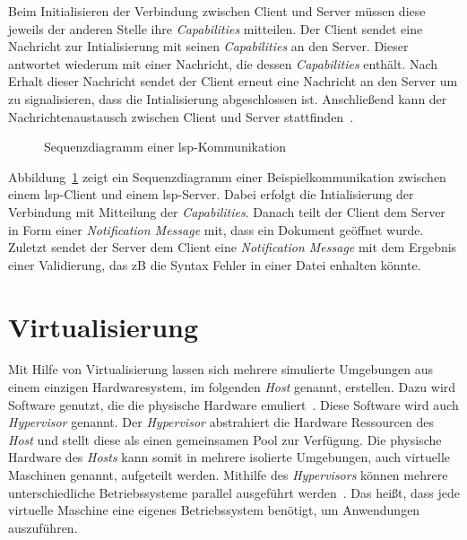 Beim Initialisieren der Verbindung zwischen Client und Server müssen diese jeweils der anderen Stelle ihre \textit{Capabilities} mitteilen.
Der Client sendet eine Nachricht zur Intialisierung mit seinen \textit{Capabilities} an den Server.
Dieser antwortet wiederum mit einer Nachricht, die dessen \textit{Capabilities} enthält.
Nach Erhalt dieser Nachricht sendet der Client erneut eine Nachricht an den Server um zu signalisieren, dass die Intialisierung abgeschlossen ist.
Anschließend kann der Nachrichtenaustausch zwischen Client und Server stattfinden~\cite{lsp-microsoft,lsp-medium}.

\begin{figure}[htp] %
    \centering
    \caption{Sequenzdiagramm einer \acs{lsp}-Kommunikation}
    \label{fig:lsp-sequence-diagram}
\end{figure}

Abbildung~\ref{fig:lsp-sequence-diagram} zeigt ein Sequenzdiagramm einer Beispielkommunikation zwischen einem \ac{lsp}-Client und einem \ac{lsp}-Server.
Dabei erfolgt die Intialisierung der Verbindung mit Mitteilung der \textit{Capabilities}.
Danach teilt der Client dem Server in Form einer \textit{Notification Message} mit, dass ein Dokument geöffnet wurde.
Zuletzt sendet der Server dem Client eine \textit{Notification Message} mit dem Ergebnis einer Validierung, das \acs{zB} die Syntax Fehler in einer Datei enhalten könnte.

\section{Virtualisierung}

Mit Hilfe von Virtualisierung lassen sich mehrere simulierte Umgebungen aus einem einzigen Hardwaresystem, im folgenden \textit{Host} genannt, erstellen.
Dazu wird Software genutzt, die die physische Hardware emuliert~\cite{virtualization-techtarget}. Diese Software wird auch \textit{Hypervisor} genannt.
Der \textit{Hypervisor} abstrahiert die Hardware Ressourcen des \textit{Host} und stellt diese als einen gemeinsamen Pool zur Verfügung.
Die physische Hardware des \textit{Hosts} kann somit in mehrere isolierte Umgebungen, auch virtuelle Maschinen genannt, aufgeteilt werden.
Mithilfe des \textit{Hypervisors} können mehrere unterschiedliche Betriebssysteme parallel ausgeführt werden~\cite{virtualization-red-hat, hypervisor-red-hat}.
Das heißt, dass jede virtuelle Maschine eine eigenes Betriebssystem benötigt, um Anwendungen auszuführen.

